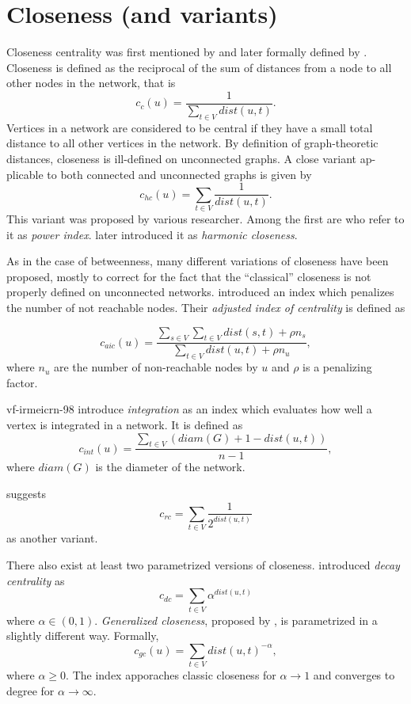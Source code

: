 \documentclass[]{book}
\theoremstyle{definition}
\theoremstyle{definition}
\theoremstyle{definition}
\theoremstyle{remark}
\begin{document}
\hypertarget{closeness-and-variants}{%
\section{Closeness (and variants)}\label{closeness-and-variants}}

Closeness centrality was first mentioned by \citet{b-cptg-50} and later
formally defined by \citet{s-cig-66}. Closeness is defined as the
reciprocal of the sum of distances from a node to all other nodes in the
network, that is \[
c_c(u)=\frac{1}{\sum\limits_{t \in V} dist(u,t)}.
\] Vertices in a network are considered to be central if they have a
small total distance to all other vertices in the network. By definition
of graph-theoretic distances, closeness is ill-defined on unconnected
graphs. A close variant ap- plicable to both connected and unconnected
graphs is given by \[
c_{hc}(u)=\sum\limits_{t \in V}\frac{1}{dist(u,t)}.
\] This variant was proposed by various researcher. Among the first are
\citet{gs-pnm-96} who refer to it as \emph{power index}.
\citet{r-cceughci-09} later introduced it as \emph{harmonic closeness}.

As in the case of betweenness, many different variations of closeness
have been proposed, mostly to correct for the fact that the
``classical'' closeness is not properly defined on unconnected networks.
\citet{mm-dpusn-74} introduced an index which penalizes the number of
not reachable nodes. Their \emph{adjusted index of centrality} is
defined as

\[
c_{aic}(u) = \frac{\sum_{s \in V}\sum_{t \in V} dist(s,t)+\rho n_s}{\sum_{t \in V} dist(u,t)+\rho n_u},
\] where \(n_u\) are the number of non-reachable nodes by \(u\) and
\(\rho\) is a penalizing factor.

vf-irmeicrn-98 introduce \emph{integration} as an index which evaluates
how well a vertex is integrated in a network. It is defined as \[
c_{int}(u)=\frac{\sum_{t \in V} (diam(G)+1-dist(u,t))}{n-1},
\] where \(diam(G)\) is the diameter of the network.

\citet{d-rcn-06} suggests \[
c_{rc}=\sum_{t \in V} \frac{1}{2^{dist(u,t)}}
\] as another variant.

There also exist at least two parametrized versions of closeness.
\citet{j-sen-10} introduced \emph{decay centrality} as \[
c_{dc}= \sum_{t \in V} \alpha^{dist(u,t)}
\] where \(\alpha \in (0,1)\). \emph{Generalized closeness}, proposed by
\citet{abe-gbculg-17}, is parametrized in a slightly different way.
Formally, \[
c_{gc}(u)=\sum_{t \in V} dist(u,t)^{-\alpha},
\] where \(\alpha\geq0\). The index apporaches classic closeness for
\(\alpha \to 1\) and converges to degree for \(\alpha \to \infty\).
\end{document}
